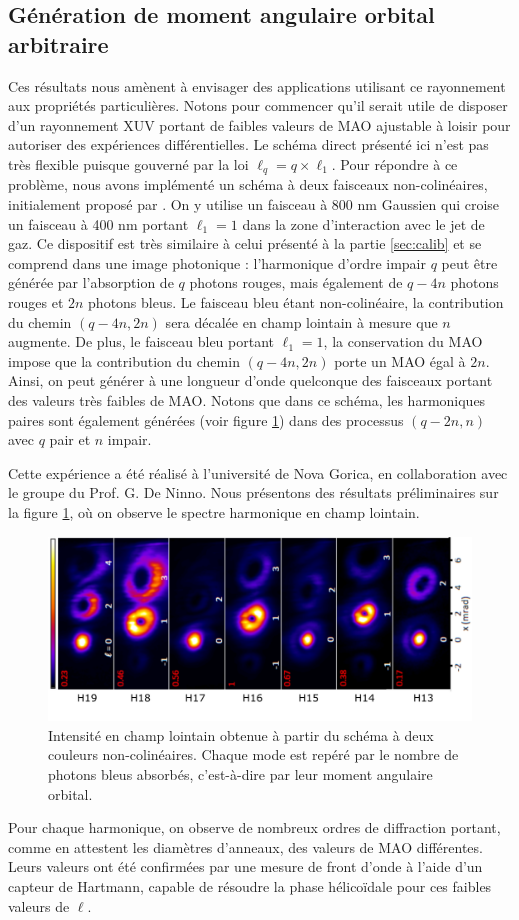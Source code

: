 \subsection{Génération de moment angulaire orbital arbitraire}
Ces résultats nous amènent à envisager des applications utilisant ce rayonnement aux propriétés particulières. Notons pour commencer qu'il serait utile de disposer d'un rayonnement XUV portant de faibles valeurs de MAO ajustable à loisir pour autoriser des expériences différentielles. Le schéma direct présenté ici n'est pas très flexible puisque gouverné par la loi $\ell_q=q\times\ell_1$. Pour répondre à ce problème, nous avons implémenté un schéma à deux faisceaux non-colinéaires, initialement proposé par . On y utilise un faisceau à 800 nm Gaussien qui croise un faisceau à 400 nm portant $\ell_1 = 1$ dans la zone d'interaction avec le jet de gaz. Ce dispositif est très similaire à celui présenté à la partie \ref{sec:calib} et se comprend dans une image photonique : l'harmonique d'ordre impair $q$ peut être générée par l'absorption de $q$ photons rouges, mais également de $q-4n$ photons rouges et $2n$ photons bleus. Le faisceau bleu étant non-colinéaire, la contribution du chemin $(q-4n,2n)$ sera décalée en champ lointain à mesure que $n$ augmente. De plus, le faisceau bleu portant $\ell_1=1$, la conservation du MAO impose que la contribution du chemin $(q-4n,2n)$ porte un MAO égal à $2n$. Ainsi, on peut générer à une longueur d'onde quelconque des faisceaux portant des valeurs très faibles de MAO. Notons que dans ce schéma, les harmoniques paires sont également générées (voir figure \ref{fig:gauthier}) dans des processus $(q-2n,n)$ avec $q$ pair et $n$ impair.

Cette expérience a été réalisé à l'université de Nova Gorica, en collaboration avec le groupe du Prof. G. De Ninno. Nous présentons des résultats préliminaires sur la figure \ref{fig:gauthier}, où on observe le spectre harmonique en champ lointain. 

\begin{figure}[!ht]
\centering
\includegraphics[width=0.8\columnwidth]{Figures/Conclusion/gauthier.pdf}%
\caption{Intensité en champ lointain obtenue à partir du schéma à deux couleurs non-colinéaires. Chaque mode est repéré par le nombre de photons bleus absorbés, c'est-à-dire par leur moment angulaire orbital.}
\label{fig:gauthier}
\end{figure}
Pour chaque harmonique, on observe de nombreux ordres de diffraction portant, comme en attestent les diamètres d'anneaux, des valeurs de MAO différentes. Leurs valeurs ont été confirmées par une mesure de front d'onde à l'aide d'un capteur de Hartmann, capable de résoudre la phase hélicoïdale pour ces faibles valeurs de $\ell$.

